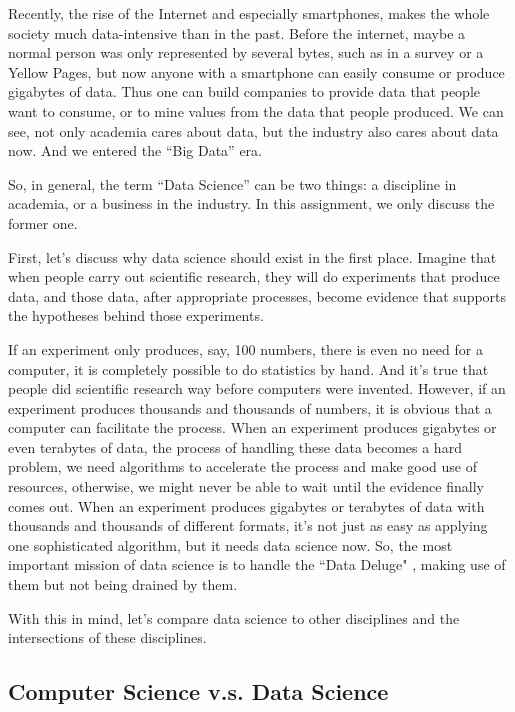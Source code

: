 Recently, the rise of the Internet and especially smartphones, makes the whole society much data-intensive than in the past.
Before the internet, maybe a normal person was only represented by several bytes, such as in a survey or a Yellow Pages, but now anyone with a smartphone can easily consume or produce gigabytes of data.
Thus one can build companies to provide data that people want to consume, or to mine values from the data that people produced.
We can see, not only academia cares about data, but the industry also cares about data now.
And we entered the ``Big Data'' era.

So, in general, the term ``Data Science'' can be two things: a discipline in academia, or a business in the industry.
In this assignment, we only discuss the former one.

First, let's discuss why data science should exist in the first place.
Imagine that when people carry out scientific research, they will do experiments that produce data, and those data, after appropriate processes, become evidence that supports the hypotheses behind those experiments.

If an experiment only produces, say, 100 numbers, there is even no need for a computer, it is completely possible to do statistics by hand.
And it's true that people did scientific research way before computers were invented.
However, if an experiment produces thousands and thousands of numbers, it is obvious that a computer can facilitate the process.
When an experiment produces gigabytes or even terabytes of data, the process of handling these data becomes a hard problem, we need algorithms to accelerate the process and make good use of resources, otherwise, we might never be able to wait until the evidence finally comes out.
When an experiment produces gigabytes or terabytes of data with thousands and thousands of different formats, it's not just as easy as applying one sophisticated algorithm, but it needs data science now. 
So, the most important mission of data science is to handle the ``Data Deluge" \cite{hey_data_2003}, making use of them but not being drained by them.

With this in mind, let's compare data science to other disciplines and the intersections of these disciplines.

\subsection*{Computer Science v.s. Data Science}

